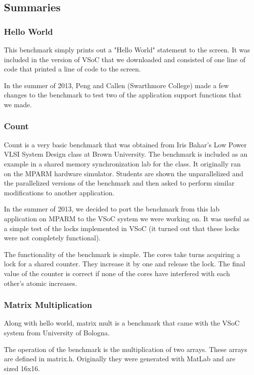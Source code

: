 \documentclass{article}
\begin{document}
\subsection{Summaries}
\subsubsection{Hello World}

This benchmark simply prints out a "Hello World" statement to the screen. It 
was included in the version of VSoC that we downloaded and consisted of one 
line of code that printed a line of code to the screen. 

In the summer of 2013, Peng and Callen (Swarthmore College) made a few changes 
to the benchmark to test two of the application support functions that we made. 

\subsubsection{Count}

Count is a very basic benchmark that was obtained from Iris Bahar's Low Power 
VLSI System Design class at Brown University. The benchmark is included as an 
example in a shared memory synchronization lab for the class. It originally 
ran on the MPARM hardware simulator. Students are shown the unparallelized and 
the parallelized versions of the benchmark and then asked to perform similar 
modifications to another application. 

In the summer of 2013, we decided to port the benchmark from this lab 
application on MPARM to the VSoC system we were working on.  It was useful as 
a simple test of the locks implemented in VSoC (it turned out that these locks 
were not completely functional).

The functionality of the benchmark is simple. The cores take turns acquiring a 
lock for a shared counter. They increase it by one and release the lock. The 
final value of the counter is correct if none of the cores have interfered 
with each other's atomic increases.

\subsubsection{Matrix Multiplication}

Along with hello world, matrix mult is a benchmark that came with the VSoC 
system from University of Bologna. 

The operation of the benchmark is the multiplication of two arrays. These 
arrays are defined in matrix.h. Originally they were generated with MatLab and 
are sized 16x16. 
\end{document}
